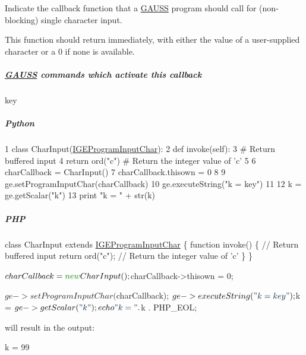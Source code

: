 Indicate the callback function that a \hyperlink{class_g_a_u_s_s}{G\-A\-U\-S\-S} program should call for (non-\/blocking) single character input. 

This function should return immediately, with either the value of a user-\/supplied character or a 0 if none is available.

\subparagraph*{\hyperlink{class_g_a_u_s_s}{G\-A\-U\-S\-S} commands which activate this callback}


\begin{DoxyItemize}
\item {\ttfamily key}
\end{DoxyItemize}

\subparagraph*{Python}


\begin{DoxyCode}
1 \textcolor{keyword}{class }CharInput(\hyperlink{class_i_g_e_program_input_char}{IGEProgramInputChar}):
2     \textcolor{keyword}{def }invoke(self):
3         \textcolor{comment}{# Return buffered input}
4         \textcolor{keywordflow}{return} ord(\textcolor{stringliteral}{"c"}) \textcolor{comment}{# Return the integer value of 'c'}
5 
6 charCallback = CharInput()
7 charCallback.thisown = 0
8 
9 ge.setProgramInputChar(charCallback)
10 ge.executeString(\textcolor{stringliteral}{"k = key"})
11 
12 k = ge.getScalar(\textcolor{stringliteral}{"k"})
13 \textcolor{keywordflow}{print} \textcolor{stringliteral}{"k = "} + str(k)
\end{DoxyCode}


\subparagraph*{P\-H\-P}


\begin{DoxyCode}
\textcolor{keyword}{class }CharInput \textcolor{keyword}{extends} \hyperlink{class_i_g_e_program_input_char}{IGEProgramInputChar} \{
    \textcolor{keyword}{function} invoke() \{
        \textcolor{comment}{// Return buffered input}
        \textcolor{keywordflow}{return} ord(\textcolor{stringliteral}{"c"}); \textcolor{comment}{// Return the integer value of 'c'}
    \}
\}

$charCallback = \textcolor{keyword}{new} CharInput();
$charCallback->thisown = 0;

$ge->setProgramInputChar($charCallback);
$ge->executeString(\textcolor{stringliteral}{"k = key"});

$k = $ge->getScalar(\textcolor{stringliteral}{"k"});
echo \textcolor{stringliteral}{"k = "} . $k . PHP\_EOL;
\end{DoxyCode}


will result in the output\-: 
\begin{DoxyCode}
k = 99
\end{DoxyCode}




